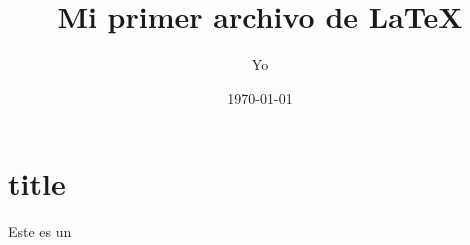 \documentclass{article}
\author{Yo}
\title{Mi primer archivo de \LaTeX}
\date{\today}
\begin{document}
	\maketitle
	
	\section{title}
	Este es un 
\end{document}
